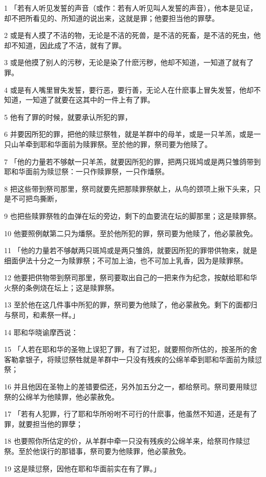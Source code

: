 \par 1 「若有人听见发誓的声音（或作：若有人听见叫人发誓的声音），他本是见证，却不把所看见的、所知道的说出来，这就是罪；他要担当他的罪孽。
\par 2 或是有人摸了不洁的物，无论是不洁的死兽，是不洁的死畜，是不洁的死虫，他却不知道，因此成了不洁，就有了罪。
\par 3 或是他摸了别人的污秽，无论是染了什麽污秽，他却不知道，一知道了就有了罪。
\par 4 或是有人嘴里冒失发誓，要行恶，要行善，无论人在什麽事上冒失发誓，他却不知道，一知道了就要在这其中的一件上有了罪。
\par 5 他有了罪的时候，就要承认所犯的罪，
\par 6 并要因所犯的罪，把他的赎愆祭牲，就是羊群中的母羊，或是一只羊羔，或是一只山羊牵到耶和华面前为赎罪祭。至於他的罪，祭司要为他赎了。
\par 7 「他的力量若不够献一只羊羔，就要因所犯的罪，把两只斑鸠或是两只雏鸽带到耶和华面前为赎愆祭：一只作赎罪祭，一只作燔祭。
\par 8 把这些带到祭司那里，祭司就要先把那赎罪祭献上，从鸟的颈项上揪下头来，只是不可把鸟撕断，
\par 9 也把些赎罪祭牲的血弹在坛的旁边，剩下的血要流在坛的脚那里；这是赎罪祭。
\par 10 他要照例献第二只为燔祭。至於他所犯的罪，祭司要为他赎了，他必蒙赦免。
\par 11 「他的力量若不够献两只斑鸠或是两只雏鸽，就要因所犯的罪带供物来，就是细面伊法十分之一为赎罪祭；不可加上油，也不可加上乳香，因为是赎罪祭。
\par 12 他要把供物带到祭司那里，祭司要取出自己的一把来作为纪念，按献给耶和华火祭的条例烧在坛上；这是赎罪祭。
\par 13 至於他在这几件事中所犯的罪，祭司要为他赎了，他必蒙赦免。剩下的面都归与祭司，和素祭一样。」
\par 14 耶和华晓谕摩西说：
\par 15 「人若在耶和华的圣物上误犯了罪，有了过犯，就要照你所估的，按圣所的舍客勒拿银子，将赎愆祭牲就是羊群中一只没有残疾的公绵羊牵到耶和华面前为赎愆祭；
\par 16 并且他因在圣物上的差错要偿还，另外加五分之一，都给祭司。祭司要用赎愆祭的公绵羊为他赎罪，他必蒙赦免。
\par 17 「若有人犯罪，行了耶和华所吩咐不可行的什麽事，他虽然不知道，还是有了罪，就要担当他的罪孽；
\par 18 也要照你所估定的价，从羊群中牵一只没有残疾的公绵羊来，给祭司作赎愆祭。至於他误行的那错事，祭司要为他赎罪，他必蒙赦免。
\par 19 这是赎愆祭，因他在耶和华面前实在有了罪。」

